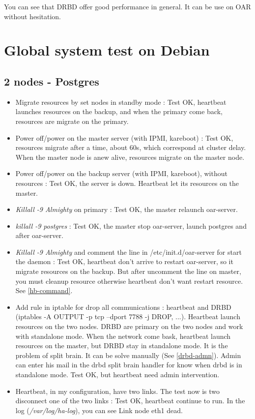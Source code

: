 \documentclass[a4paper,10pt]{report}
\begin{document}
You can see that DRBD offer good performance in general. It can be use on OAR without hesitation.



\section{Global system test on Debian}
\subsection{2 nodes - Postgres}
\begin{itemize}
 \item Migrate resources by set nodes in standby mode : Test OK, heartbeat launches resources on the backup, and when the primary come back, resources are migrate on the primary.
 \item Power off/power on the master server (with IPMI, kareboot) : Test OK, resources migrate after a time, about 60s, which correspond at cluster delay. When the master node is anew alive, resources migrate on the master node.
 \item Power off/power on the backup server (with IPMI, kareboot), without resources : Test OK, the server is down. Heartbeat let its resources on the master.
 \item \textit{Killall -9 Almighty} on primary : Test OK, the master relaunch oar-server.
 \item \textit{killall -9 postgres} : Test OK, the master stop oar-server, launch postgres and after oar-server.
 \item \textit{Killall -9 Almighty} and comment the line in /etc/init.d/oar-server for start the daemon : Test OK, heartbeat don't arrive to restart oar-server, so it migrate resources on the backup.
But after uncomment the line on master, you must cleanup resource otherwise heartbeat don't want restart resource. See \ref{hb-command}.
 \item Add rule in iptable for drop all communications : heartbeat and DRBD (iptables -A OUTPUT -p tcp --dport 7788 -j DROP, ...). Heartbeat launch resources on the two nodes. DRBD are primary on the two nodes and work with standalone mode. When the network come bask, heartbeat launch resources on the master, but DRBD stay in standalone mode. It is the problem of split brain. It can be solve manually (See \ref{drbd-admn}).
Admin can enter his mail in the drbd split brain handler for know when drbd is in standalone mode. Test OK, but heartbeat need admin intervention.
 \item Heartbeat, in my configuration, have two links. The test now is two disconnect one of the two links : Test OK, heartbeat continue to run. In the log (\textit{/var/log/ha-log}), you can see Link node eth1 dead.
\end{itemize}
\end{document}
